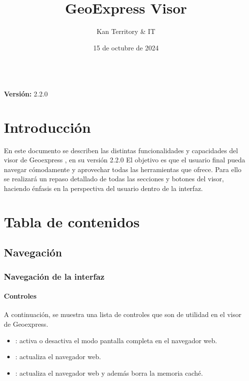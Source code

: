 \documentclass[a4paper,11pt,spanish]{sphinxmanual}
\date {}
\title{GeoExpress Visor}
\date{15 de octubre de 2024}
\author{Kan Territory \& IT}
\newcommand{\therelease}{2.2.0}
\renewcommand{\sphinxmaketitle}{%
      \begingroup
        \begin{center}
          \vspace*{4cm}  %
          {\Huge \textbf{\color[RGB]{240,56,97} \thetitle}}  %
          \vspace{1.5cm}  %
          \\
          {\Large \textbf{\color[RGB]{240,56,97} Versión:} \color[RGB]{240,56,97} \therelease}  %
        \end{center}
      \endgroup
    }
\begin{document}
\pagestyle{empty}
\sphinxmaketitle
\pagestyle{plain}
\sphinxtableofcontents
\pagestyle{normal}
\label{\detokenize{index::doc}}



\chapter{Introducción}
\label{\detokenize{index:introduccion}}
\sphinxAtStartPar
En este documento se describen las distintas funcionalidades y capacidades del visor de Geoexpress , en su versión 2.2.0
El objetivo es que el usuario final pueda navegar cómodamente y aprovechar todas las herramientas que ofrece. Para ello se realizará un repaso detallado de todas las secciones y botones del visor, haciendo énfasis en la perspectiva del usuario dentro de la interfaz.

\noindent{}


\chapter{Tabla de contenidos}
\label{\detokenize{index:tabla-de-contenidos}}
\sphinxstepscope


\section{Navegación}
\label{\detokenize{navigation/index:navegacion}}\label{\detokenize{navigation/index::doc}}
\sphinxstepscope


\subsection{Navegación de la interfaz}
\label{\detokenize{navigation/interfaz:navegacion-de-la-interfaz}}\label{\detokenize{navigation/interfaz::doc}}

\subsubsection{Controles}
\label{\detokenize{navigation/interfaz:controles}}
\sphinxAtStartPar
A continuación, se muestra una lista de controles que son de utilidad en el visor de Geoexpress.
\begin{itemize}
\item {} 
\sphinxAtStartPar
{}: activa o desactiva el modo pantalla completa en el navegador web.

\item {} 
\sphinxAtStartPar
{}: actualiza el navegador web.

\item {} 
\sphinxAtStartPar
{}: actualiza el navegador web y además borra la memoria caché.

\end{itemize}
\end{document}
